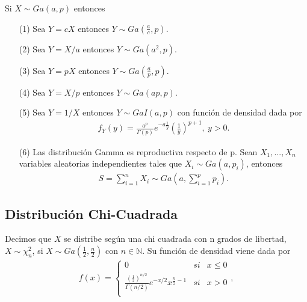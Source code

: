 \begin{prop}
    Si $X \sim Ga(a,p)$ entonces
    \begin{enumerate}
        \item[(1)] Sea $Y = cX$ entonces $Y \sim Ga\left( \frac{a}{c}, p \right)$.
        \item[(2)] Sea $Y = X/a$ entonces $Y \sim Ga(a^2,p)$.
        \item[(3)] Sea $Y = pX$ entonces $Y \sim Ga\left( \frac{a}{p},p\right)$.
        \item[(4)] Sea $Y = X/p$ entonces $Y \sim Ga(ap, p)$.
        \item[(5)] Sea $Y = 1/X$ entonces $Y \sim GaI(a,p)$ con función de densidad dada por
              \begin{align*}
                  f_Y(y) = \frac{a^p}{\Gamma(p)}e^{-a\frac{1}{y}}\left(\frac{1}{y}\right)^{p+1}, \ y > 0.
              \end{align*}
        \item[(6)] Las distribución Gamma es reproductiva respecto de p. Sean $X_1,...,X_n$ variables aleatorias independientes tales que $X_i \sim Ga(a, p_i)$, entonces
              \begin{align*}
                  S = \sum_{i=1}^{n}{X_i} \sim Ga\left( a, \sum_{i=1}^{p}{p_i} \right).
              \end{align*}
    \end{enumerate}
\end{prop}

\subsection{Distribución Chi-Cuadrada}

\begin{defi}
    Decimos que $X$ se distribe según una chi cuadrada con n grados de libertad, $X \sim \chi_n^2$, si $X \sim Ga\left( \frac{1}{2}, \frac{n}{2}\right)$ con $n \in \mathbb{N}$. Su función de densidad viene dada por
    \begin{align*}
        f(x) = \left\{ \begin{array}{lcc}
                           0                                                                              & si & x \leq 0 \\
                           \frac{\left( \frac{1}{2}\right)^{n/2}}{\Gamma(n/2)}e^{-x/2}x^{\frac{n}{2} - 1} & si & x > 0    \\
                       \end{array}
        \right. ,
    \end{align*}
\end{defi}

